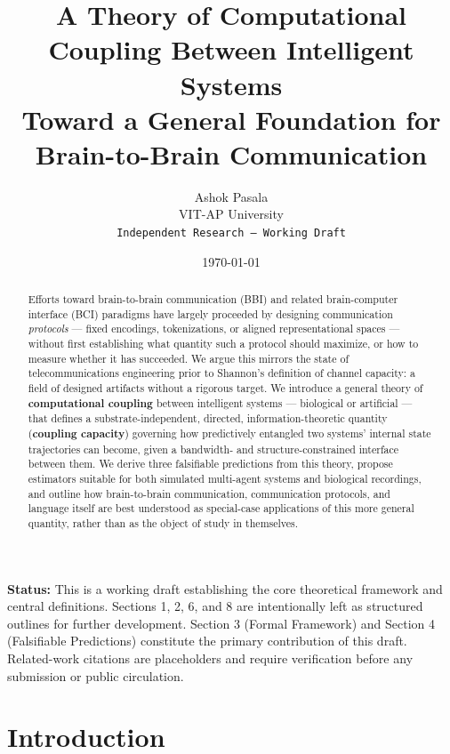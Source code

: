 \documentclass[11pt]{article}
\title{\Large \textbf{A Theory of Computational Coupling Between Intelligent Systems}\\[4pt]
\large Toward a General Foundation for Brain-to-Brain Communication}
\author{Ashok Pasala \\[2pt] \small VIT-AP University \\[2pt] \small \texttt{Independent Research --- Working Draft}}
\date{\today}
\begin{document}
\maketitle

\begin{center}
\colorbox{yellow!20}{\parbox{0.9\textwidth}{\small \textbf{Status:} This is a working draft establishing the core theoretical framework and central definitions. Sections 1, 2, 6, and 8 are intentionally left as structured outlines for further development. Section 3 (Formal Framework) and Section 4 (Falsifiable Predictions) constitute the primary contribution of this draft. Related-work citations are placeholders and require verification before any submission or public circulation.}}
\end{center}

\vspace{8pt}

\begin{abstract}
\noindent
Efforts toward brain-to-brain communication (BBI) and related brain-computer interface (BCI) paradigms have largely proceeded by designing communication \emph{protocols} --- fixed encodings, tokenizations, or aligned representational spaces --- without first establishing what quantity such a protocol should maximize, or how to measure whether it has succeeded. We argue this mirrors the state of telecommunications engineering prior to Shannon's definition of channel capacity: a field of designed artifacts without a rigorous target. We introduce a general theory of \textbf{computational coupling} between intelligent systems --- biological or artificial --- that defines a substrate-independent, directed, information-theoretic quantity (\textbf{coupling capacity}) governing how predictively entangled two systems' internal state trajectories can become, given a bandwidth- and structure-constrained interface between them. We derive three falsifiable predictions from this theory, propose estimators suitable for both simulated multi-agent systems and biological recordings, and outline how brain-to-brain communication, communication protocols, and language itself are best understood as special-case applications of this more general quantity, rather than as the object of study in themselves.
\end{abstract}

\section{Introduction}
\end{document}
